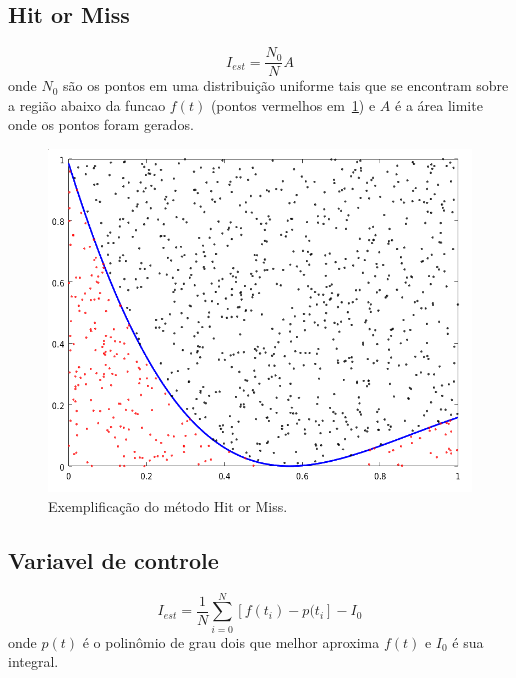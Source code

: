 \documentclass [a4paper,10pt]{article}
\begin{document}
  \subsection{Hit or Miss}
    \begin{equation}
    	I_{est} = \frac{N_0}{N}A
    \end{equation}
    onde $N_0$ são os pontos em uma distribuição uniforme tais que se encontram sobre a região abaixo da funcao
    $f(t)$ (pontos vermelhos em~\ref{hit}) e $A$ é a área limite onde os pontos foram gerados.
	{\linespread{1.15}
    }
    \begin{figure}[!ht]
      \centering
      \includegraphics[scale=0.4]{HitMiss.png}
      \caption{Exemplificação do método Hit or Miss.\label{hit}}
    \end{figure}
    
	\subsection{Variavel de controle}
    \begin{equation}
    	I_{est} = \frac{1}{N}\sum_{i = 0}^{N} [f(t_i) - p(t_i] - I_0
    \end{equation}
    onde $p(t)$ é o polinômio de grau dois que melhor aproxima $f(t)$ e $I_0$ é sua integral.
    
\end{document}
